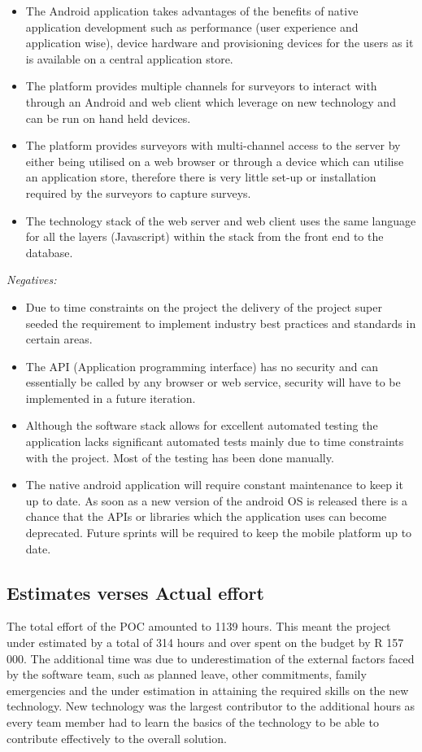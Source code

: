\documentclass[12pt]{witseiepaper}
\begin{document}
\begin{itemize}
\item The Android application takes advantages of the benefits of native application development such as performance (user experience and application wise), device hardware and provisioning devices for the users as it is available on a central application store.  
\item The platform provides multiple channels for surveyors to interact with through an Android and web client which leverage on new technology and can be run on hand held devices. 
\item The platform provides surveyors with multi-channel access to the server by either being utilised on a web browser or through a device which can utilise an application store, therefore there is very little set-up or installation required by the surveyors to capture surveys. 
\item The technology stack of the web server and web client uses the same language for all the layers (Javascript) within the stack from the front end to the database.
\end{itemize}

\textit{Negatives:}

\begin{itemize}
\item Due to time constraints on the project the delivery of the project super seeded the requirement to implement industry best practices and standards in certain areas.
\item The API (Application programming interface) has no security and can essentially be called by any browser or web service, security will have to be implemented in a future iteration.
\item Although the software stack allows for excellent automated testing the application lacks significant automated tests mainly due to time constraints with the project. Most of the testing has been done manually.
\item The native android application will require constant maintenance to keep it up to date. As soon as a new version of the android OS is released there is a chance that the APIs or libraries which the application uses can become deprecated. Future sprints will be required to keep the mobile platform up to date. 
\end{itemize}

\subsection{Estimates verses Actual effort}
The total effort of the POC amounted to 1139 hours. This meant the project under estimated by a total of 314 hours and over spent on the budget by R 157 000. The additional time was due to underestimation of the external factors faced by the software team, such as planned leave, other commitments, family emergencies and the under estimation in attaining the required skills on the new technology. New technology was the largest contributor to the additional hours as every team member had to learn the basics of the technology to be able to contribute effectively to the overall solution.
\end{document}
